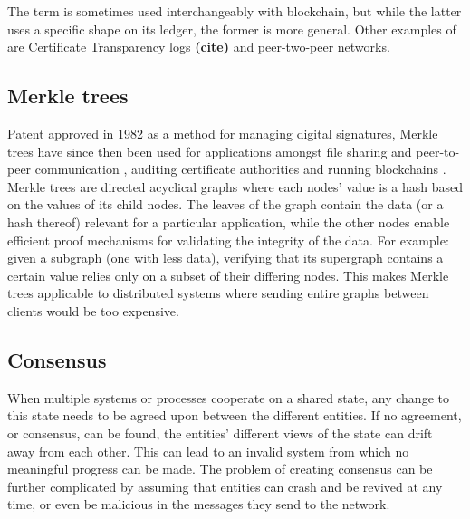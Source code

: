 \documentclass[english, biblatex, digitaloutput]{kththesis}
\begin{document}
The term  is sometimes used interchangeably with blockchain, but while the latter uses a specific shape on its ledger, the former is more general. Other examples of  are Certificate Transparency logs \textbf{(cite)} and peer-two-peer networks.

\subsection{Merkle trees}

Patent approved in 1982 \cite{merkle_method_1982} as a method for managing digital signatures, Merkle trees have since then been used for applications amongst file sharing and peer-to-peer communication \cite{daniel_ipfs_2022}, auditing certificate authorities \cite{laurie_certificate_2013} and running blockchains \cite{zahed_benisi_blockchain-based_2020}. Merkle trees are directed acyclical graphs where each nodes' value is a hash based on the values of its child nodes. The leaves of the graph contain the data (or a hash thereof) relevant for a particular application, while the other nodes enable efficient proof mechanisms for validating the integrity of the data. For example: given a subgraph (\ie one with less data), verifying that its supergraph contains a certain value relies only on a subset of their differing nodes. This makes Merkle trees applicable to distributed systems where sending entire graphs between clients would be too expensive.

\subsection{Consensus}

When multiple systems or processes cooperate on a shared state, any change to this state needs to be agreed upon between the different entities. If no agreement, or consensus, can be found, the entities' different views of the state can drift away from each other. This can lead to an invalid system from which no meaningful progress can be made. The problem of creating consensus can be further complicated by assuming that entities can crash and be revived at any time, or even be malicious in the messages they send to the network.
\end{document}
